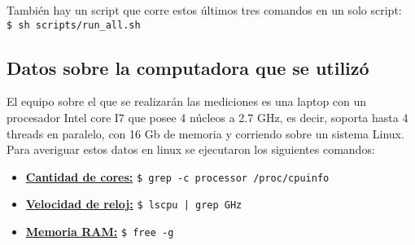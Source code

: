     \hfill \break
    También hay un script que corre estos últimos tres comandos en un solo script:\\
    \lstinline[columns=fixed]{$ sh scripts/run_all.sh}

\subsection{Datos sobre la computadora que se utilizó}
    El equipo sobre el que se realizarán las mediciones es una laptop con un
    procesador Intel core I7 que posee 4 núcleos a 2.7 GHz, es decir, soporta
    hasta 4 threads en paralelo, con 16 Gb de memoria y corriendo sobre un
    sistema Linux.\\
    Para averiguar estos datos en linux se ejecutaron los siguientes comandos:\\
    \begin{itemize}
        \item \underline{\textbf{Cantidad de cores:}} \lstinline[columns=fixed]{$ grep -c processor /proc/cpuinfo}
        \item \underline{\textbf{Velocidad de reloj:}} \lstinline[columns=fixed]{$ lscpu | grep GHz}
        \item \underline{\textbf{Memoria RAM:}} \lstinline[columns=fixed]{$ free -g}
    \end{itemize}